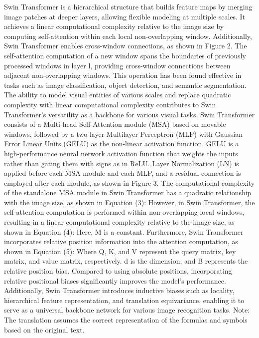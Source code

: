 \documentclass[10pt,twocolumn,letterpaper]{article}
\begin{document}
Swin Transformer is a hierarchical structure that builds feature maps by merging image patches at deeper layers, allowing flexible modeling at multiple scales. It achieves a linear computational complexity relative to the image size by computing self-attention within each local non-overlapping window. Additionally, Swin Transformer enables cross-window connections, as shown in Figure 2. The self-attention computation of a new window spans the boundaries of previously processed windows in layer l, providing cross-window connections between adjacent non-overlapping windows. This operation has been found effective in tasks such as image classification, object detection, and semantic segmentation. The ability to model visual entities of various scales and replace quadratic complexity with linear computational complexity contributes to Swin Transformer's versatility as a backbone for various visual tasks.
Swin Transformer consists of a Multi-head Self-Attention module (MSA) based on movable windows, followed by a two-layer Multilayer Perceptron (MLP) with Gaussian Error Linear Units (GELU) as the non-linear activation function. GELU is a high-performance neural network activation function that weights the inputs rather than gating them with signs as in ReLU. Layer Normalization (LN) is applied before each MSA module and each MLP, and a residual connection is employed after each module, as shown in Figure 3.
The computational complexity of the standalone MSA module in Swin Transformer has a quadratic relationship with the image size, as shown in Equation (3):
However, in Swin Transformer, the self-attention computation is performed within non-overlapping local windows, resulting in a linear computational complexity relative to the image size, as shown in Equation (4):
Here, M is a constant.
Furthermore, Swin Transformer incorporates relative position information into the attention computation, as shown in Equation (5):
Where Q, K, and V represent the query matrix, key matrix, and value matrix, respectively. d is the dimension, and B represents the relative position bias. Compared to using absolute positions, incorporating relative positional biases significantly improves the model's performance.
Additionally, Swin Transformer introduces inductive biases such as locality, hierarchical feature representation, and translation equivariance, enabling it to serve as a universal backbone network for various image recognition tasks.
Note: The translation assumes the correct representation of the formulas and symbols based on the original text.
\end{document}
